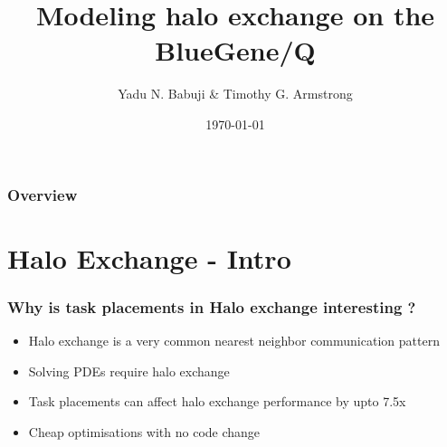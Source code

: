 \documentclass{beamer}
\title[Halo exchange on BG/Q]{Modeling halo exchange on the BlueGene/Q} %
\author{Yadu N. Babuji \& Timothy G. Armstrong} %
\institute[Dept. of Computer Science]
{
The University of Chicago \\
\medskip
}
\date{\today} %
\begin{document}
\begin{frame}
\titlepage %
\end{frame}

\begin{frame}
\frametitle{Overview} %
\tableofcontents %
\end{frame}


\section{Halo Exchange - Intro} %
\begin{frame}
\frametitle{Why is task placements in Halo exchange interesting ?}
\begin{itemize}
\item Halo exchange is a very common nearest neighbor communication pattern
\item Solving PDEs require halo exchange
\item Task placements can affect halo exchange performance by upto 7.5x
\item Cheap optimisations with no code change
\end{itemize}
\end{frame}
\end{document}
